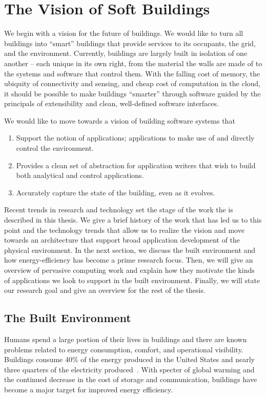 \chapter{The Vision of Soft Buildings}

We begin with a vision for the future of buildings.  We would like to turn all buildings into ``smart''
buildings that provide services to its occupants, the grid, and the environment.  Currently, buildings
are largely built in isolation of one another -- each unique in its own right, from the material the walls
are made of to the systems and software that control them.  With the falling cost of memory, the ubiquity of
connectivity and sensing, and cheap cost of computation in the cloud, it should be possible to make buildings ``smarter''
through software guided by the principals of extensibility and clean, well-defined software interfaces.

We would like to move towards a vision of building software systems that

\begin{enumerate}
\item Support the notion of applications; applications to make use of and directly control the environment.
\item Provides a clean set of abstraction for application writers that wish to build both analytical and control
applications.
\item Accurately capture the state of the building, even as it evolves.
\end{enumerate}


Recent trends in research and technology
set the stage of the work the is described in this thesis.  We give a brief history of the work that has 
led us to this point and the technology trends that allow us to realize the vision and move towards
an architecture that support broad application development of the physical environment.
In the next section, 
we discuss the built environment and how energy-efficiency has become a prime research focus.
Then, we will give an overview of pervasive computing work and explain how they motivate the kinds of applications we look 
to support in the built environment.  Finally, we will state our research goal and give an overview for the rest
of the thesis.




\section{The Built Environment}
Humans spend a large portion of their lives in buildings and
there are known problems related to energy consumption, comfort, and operational visibility.  
Buildings consume 40\% of the energy produced in the United States and nearly three quarters of 
the electricity produced~\cite{epabuildings}.  With specter of global warming and the continued decrease in the cost of storage and 
communication, buildings have become a major target for improved energy efficiency.

